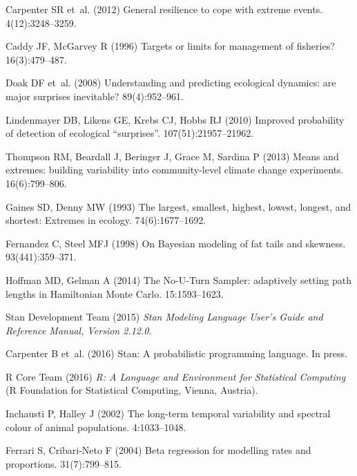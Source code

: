 \documentclass[9pt,twocolumn,twoside]{pnas-new}
\begin{document}
\begin{thebibliography}{10}
{Carpenter} SR et~al. (2012) General resilience to cope with extreme events.
 4(12):3248--3259.

Caddy JF, McGarvey R (1996) Targets or limits for management of fisheries?
 16(3):479--487.

Doak DF et~al. (2008) Understanding and predicting ecological dynamics: are
  major surprises inevitable?
 89(4):952--961.

Lindenmayer DB, Likens GE, Krebs CJ, Hobbs RJ (2010) Improved probability of
  detection of ecological ``surprises''.
 107(51):21957--21962.

Thompson RM, Beardall J, Beringer J, Grace M, Sardina P (2013) Means and
  extremes: building variability into community-level climate change
  experiments.
 16(6):799--806.

Gaines SD, Denny MW (1993) The largest, smallest, highest, lowest, longest, and
  shortest: Extremes in ecology.
 74(6):1677--1692.

Fernandez C, Steel MFJ (1998) On {Bayesian} modeling of fat tails and skewness.
 93(441):359--371.

Hoffman MD, Gelman A (2014) The {No-U-Turn Sampler}: adaptively setting path
  lengths in {Hamiltonian Monte Carlo}.
 15:1593--1623.

{Stan Development Team} (2015) {\em Stan Modeling Language User's Guide and
  Reference Manual, Version 2.12.0}.

Carpenter B et~al. (2016) Stan: A probabilistic programming language.
 In press.

{R Core Team} (2016) {\em R: A Language and Environment for Statistical
  Computing} (R Foundation for Statistical Computing, Vienna, Austria).

Inchausti P, Halley J (2002) The long-term temporal variability and spectral
  colour of animal populations.
 4:1033--1048.

Ferrari S, Cribari-Neto F (2004) Beta regression for modelling rates and
  proportions.
 31(7):799--815.


\end{thebibliography}
\end{document}
